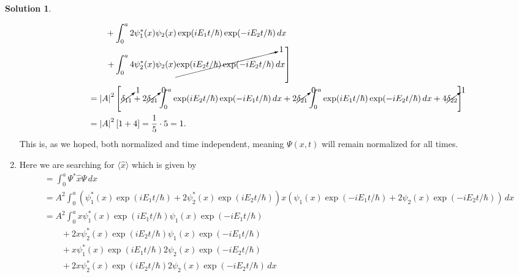 \documentclass[10pt]{article}
\theoremstyle{definition}
\newtheorem{soln}{Solution}
\begin{document}
\begin{soln}
\begin{enumerate}[label=(\alph*)]
\begin{align*}
             & \qquad+\int_{0}^{a}2\psi_1^*(x)\psi_2(x)\exp(iE_1t/\hbar)\exp(-iE_2t/\hbar)\,dx                                                                       \\
             & \left.\qquad+\int_{0}^{a}4\psi_2^*(x)\psi_2(x)\cancelto{1}{\exp(iE_2t/\hbar)\exp(-iE_2t/\hbar)}
            \,dx\right]                                                                                                                                              \\
             & =\abs{A}^2\left[
              \cancelto{1}{\delta_{11}}
              +2\cancelto{0}{\delta_{21}}\int_{0}^{a}\exp(iE_2t/\hbar)\exp(-iE_1t/\hbar)\,dx
              +2\cancelto{0}{\delta_{21}}\int_{0}^{a}\exp(iE_1t/\hbar)\exp(-iE_2t/\hbar)\,dx
            +4\cancelto{1}{\delta_{22}}\right]                                                                                                                       \\
             & =\abs{A}^2\left[1+4\right]=\frac{1}{5}\cdot 5=1.
          \end{align*}
          This is, as we hoped, both normalized and time independent, meaning $\Psi(x,t)$ will remain normalized for all times.
    \item Here we are searching for $\langle \hat{x}\rangle$ which is given by
          \begin{align*}
             & =\int_{0}^{a}\Psi^*\hat{x}\Psi\,dx                                                                                                                                \\
             & =A^2\int_{0}^{a}(\psi_1^*(x)\exp(iE_1t/\hbar)+2\psi_2^*(x)\exp(iE_2t/\hbar))x(\psi_1(x)\exp(-iE_1t/\hbar)+2\psi_2(x)\exp(-iE_2t/\hbar))\,dx                       \\
             & =A^2\int_{0}^{a}x\psi_1^*(x)\exp(iE_1t/\hbar)\psi_1(x)\exp(-iE_1t/\hbar)                                                                                          \\
             & \qquad+2x\psi_2^*(x)\exp(iE_2t/\hbar)\psi_1(x)\exp(-iE_1t/\hbar)                                                                                                  \\
             & \qquad+x\psi_1^*(x)\exp(iE_1t/\hbar)2\psi_2(x)\exp(-iE_2t/\hbar)                                                                                                  \\
             & \qquad+2x\psi_2^*(x)\exp(iE_2t/\hbar)2\psi_2(x)\exp(-iE_2t/\hbar)\,dx                                                                                             \\

\end{align*}
\end{enumerate}
\end{soln}
\end{document}

